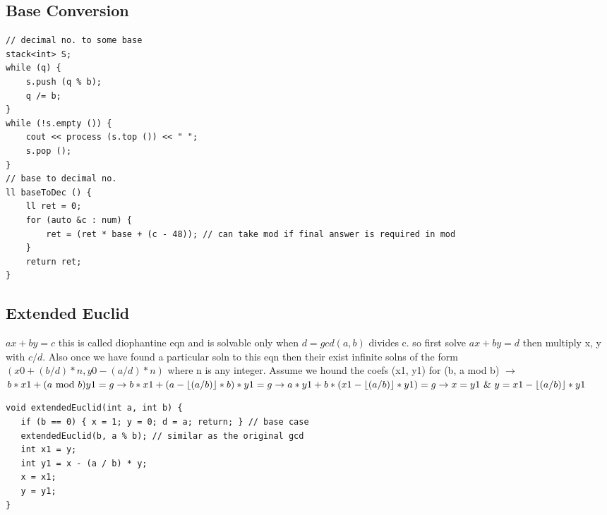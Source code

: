 \documentclass[8pt, a4paper, oneside, twocolumn]{extarticle}
\begin{document}
\subsection{Base Conversion}
\begin{verbatim}
// decimal no. to some base
stack<int> S;
while (q) {
    s.push (q % b);
    q /= b;
}
while (!s.empty ()) {
    cout << process (s.top ()) << " ";
    s.pop ();
}
// base to decimal no.
ll baseToDec () {
    ll ret = 0;
    for (auto &c : num) {
        ret = (ret * base + (c - 48)); // can take mod if final answer is required in mod
    }
    return ret;
}
\end{verbatim}
\subsection{Extended Euclid}
$ax + by = c$ this is called diophantine eqn and is solvable only when $d = gcd(a, b)$ divides c. so first solve $ax + by = d$ then multiply x, y with $c / d$. Also once we have found a particular soln to this eqn then their exist infinite solns of the form $(x0 + (b/d)*n, y0 - (a/d)*n)$ where n is any integer. Assume we hound the coefs (x1, y1) for (b, a mod b) $\rightarrow$ $b*x1 + (a\text{ mod }b)y1 = g\\ \rightarrow b*x1 + (a - \lfloor(a/b)\rfloor*b)*y1=g\\
\rightarrow a*y1 + b*(x1 - \lfloor (a/b)\rfloor * y1) = g\\
\rightarrow x = y1\text{ \& }y = x1 - \lfloor (a/b)\rfloor*y1$
\begin{verbatim}
void extendedEuclid(int a, int b) {
   if (b == 0) { x = 1; y = 0; d = a; return; } // base case
   extendedEuclid(b, a % b); // similar as the original gcd
   int x1 = y;
   int y1 = x - (a / b) * y;
   x = x1;
   y = y1;
}
\end{verbatim}
\end{document}
